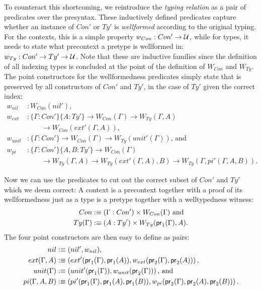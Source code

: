 To counteract this shortcoming, we reintroduce the \emph{typing relation} as a pair of
predicates over the presyntax.
These inductively defined predicates capture whether an instance of $Con'$ or $Ty'$ is \emph{wellformed} according to the original typing.
For the contexts, this is a simple property $w_{Con} : Con' \to \mathcal{U}$, while for
types, it needs to state what precontext a pretype is wellformed in:
$w_{Ty} : Con' \to Ty' \to \mathcal{U}$.
Note that these are inductive families since the definition of all indexing types
is concluded at the point of the definition of $W_{Con}$ and $W_{Ty}$.
The point constructors for the wellformedness predicates simply state that
is preserved by all constructors of $Con'$ and $Ty'$, in the case of $Ty'$ given the
correct index:
\begin{align*}
w_{nil} &: W_{Con}(nil') \text{,} \\
w_{ext} &: \{\Gamma : Con'\} \{A : Ty'\}
    \to W_{Con}(\Gamma) \to W_{Ty}(\Gamma, A) \\
  & \qquad \to W_{Con}(ext'(\Gamma, A)) \text{,}\\
w_{unit} &: \{\Gamma : Con'\} \to W_{Con}(\Gamma) \to W_{Ty}(unit'(\Gamma)) \text{, and}\\
w_{pi} &: \{\Gamma : Con'\} \{A, B : Ty'\} \to
    W_{Con}(\Gamma) \\
  & \qquad \to W_{Ty}(\Gamma, A) \to W_{Ty}(ext'(\Gamma, A), B)
    \to W_{Ty}(\Gamma, pi'(\Gamma, A, B)) \text{.}
\end{align*}

Now we can use the predicates to cut out the correct subset of $Con'$ and
$Ty'$ which we deem correct:
A context is a precontext together with a proof of its wellformedness just
as a type is a pretype together with a welltypedness witness:
\begin{align*}
Con &:\equiv (\Gamma : Con') \times W_{Con}(\Gamma) \text{ and}\\
Ty(\Gamma) &:\equiv (A : Ty') \times W_{Ty}(\mathsf{pr}_1(\Gamma), A) \text{.}
\end{align*}
The four point constructors are then easy to define as pairs:
\begin{align*}
nil &:\equiv (nil', w_{nil}) \text{,}\\
ext(\Gamma, A) &:\equiv \left(ext'(\mathsf{pr}_1(\Gamma),
    \mathsf{pr}_1(A)), w_{ext}(\mathsf{pr}_2(\Gamma), \mathsf{pr}_2(A)) \right) \text{,}\\
unit(\Gamma) &:\equiv \left(unit'(\mathsf{pr}_1(\Gamma)),
    w_{unit}(\mathsf{pr}_2(\Gamma)) \right) \text{, and}\\
pi(\Gamma, A, B) &:\equiv \left(pi'(\mathsf{pr}_1(\Gamma), \mathsf{pr}_1(A), \mathsf{pr}_1(B)),
   w_{pi}(\mathsf{pr}_2(\Gamma), \mathsf{pr}_2(A), \mathsf{pr}_2(B)) \right) \text{.}
\end{align*}

